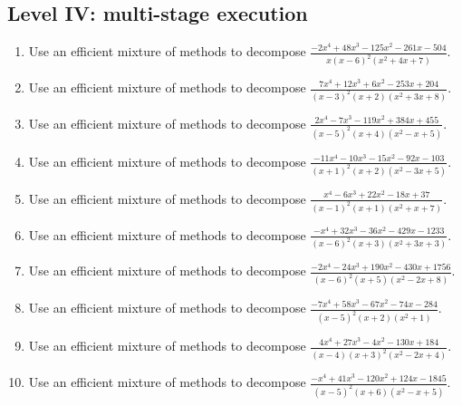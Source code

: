 \documentclass[11pt,oneside]{book}
\begin{document}
\subsection*{Level IV: multi-stage execution}
\begin{enumerate}[leftmargin=*,label=\textbf{\arabic*.},itemsep=0.65\baselineskip]
\item Use an efficient mixture of methods to decompose $\displaystyle \frac{- 2 x^{4} + 48 x^{3} - 125 x^{2} - 261 x - 504}{x \left(x - 6\right)^{2} \left(x^{2} + 4 x + 7\right)}$.
\item Use an efficient mixture of methods to decompose $\displaystyle \frac{7 x^{4} + 12 x^{3} + 6 x^{2} - 253 x + 204}{\left(x - 3\right)^{2} \left(x + 2\right) \left(x^{2} + 3 x + 8\right)}$.
\item Use an efficient mixture of methods to decompose $\displaystyle \frac{2 x^{4} - 7 x^{3} - 119 x^{2} + 384 x + 455}{\left(x - 5\right)^{2} \left(x + 4\right) \left(x^{2} - x + 5\right)}$.
\item Use an efficient mixture of methods to decompose $\displaystyle \frac{- 11 x^{4} - 10 x^{3} - 15 x^{2} - 92 x - 103}{\left(x + 1\right)^{2} \left(x + 2\right) \left(x^{2} - 3 x + 5\right)}$.
\item Use an efficient mixture of methods to decompose $\displaystyle \frac{x^{4} - 6 x^{3} + 22 x^{2} - 18 x + 37}{\left(x - 1\right)^{2} \left(x + 1\right) \left(x^{2} + x + 7\right)}$.
\item Use an efficient mixture of methods to decompose $\displaystyle \frac{- x^{4} + 32 x^{3} - 36 x^{2} - 429 x - 1233}{\left(x - 6\right)^{2} \left(x + 3\right) \left(x^{2} + 3 x + 3\right)}$.
\item Use an efficient mixture of methods to decompose $\displaystyle \frac{- 2 x^{4} - 24 x^{3} + 190 x^{2} - 430 x + 1756}{\left(x - 6\right)^{2} \left(x + 5\right) \left(x^{2} - 2 x + 8\right)}$.
\item Use an efficient mixture of methods to decompose $\displaystyle \frac{- 7 x^{4} + 58 x^{3} - 67 x^{2} - 74 x - 284}{\left(x - 5\right)^{2} \left(x + 2\right) \left(x^{2} + 1\right)}$.
\item Use an efficient mixture of methods to decompose $\displaystyle \frac{4 x^{4} + 27 x^{3} - 4 x^{2} - 130 x + 184}{\left(x - 4\right) \left(x + 3\right)^{2} \left(x^{2} - 2 x + 4\right)}$.
\item Use an efficient mixture of methods to decompose $\displaystyle \frac{- x^{4} + 41 x^{3} - 120 x^{2} + 124 x - 1845}{\left(x - 5\right)^{2} \left(x + 6\right) \left(x^{2} - x + 5\right)}$.
\end{enumerate}
\end{document}
